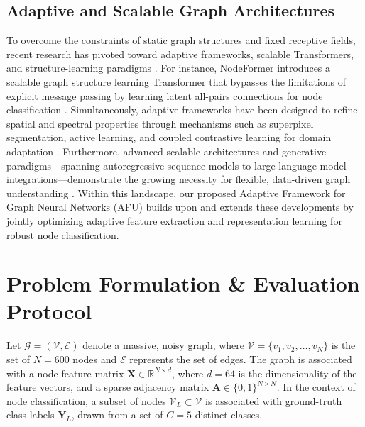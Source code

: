 \documentclass[10pt,twocolumn]{article}
\begin{document}
\subsection{Adaptive and Scalable Graph Architectures}
To overcome the constraints of static graph structures and fixed receptive fields, recent research has pivoted toward adaptive frameworks, scalable Transformers, and structure-learning paradigms \cite{target_ref, ref_5}. For instance, NodeFormer introduces a scalable graph structure learning Transformer that bypasses the limitations of explicit message passing by learning latent all-pairs connections for node classification \cite{target_ref}. Simultaneously, adaptive frameworks have been designed to refine spatial and spectral properties through mechanisms such as superpixel segmentation, active learning, and coupled contrastive learning for domain adaptation \cite{ref_5, ref_7}. Furthermore, advanced scalable architectures and generative paradigms—spanning autoregressive sequence models to large language model integrations—demonstrate the growing necessity for flexible, data-driven graph understanding \cite{ref_1, ref_8}. Within this landscape, our proposed Adaptive Framework for Graph Neural Networks (\textsc{AFU}) builds upon and extends these developments by jointly optimizing adaptive feature extraction and representation learning for robust node classification.

\section{Problem Formulation \& Evaluation Protocol}
Let $\mathcal{G} = (\mathcal{V}, \mathcal{E})$ denote a massive, noisy graph, where $\mathcal{V} = \{v_1, v_2, \dots, v_N\}$ is the set of $N = 600$ nodes and $\mathcal{E}$ represents the set of edges. The graph is associated with a node feature matrix $\mathbf{X} \in \mathbb{R}^{N \times d}$, where $d = 64$ is the dimensionality of the feature vectors, and a sparse adjacency matrix $\mathbf{A} \in \{0, 1\}^{N \times N}$. In the context of node classification, a subset of nodes $\mathcal{V}_L \subset \mathcal{V}$ is associated with ground-truth class labels $\mathbf{Y}_L$, drawn from a set of $C = 5$ distinct classes. 
\end{document}
